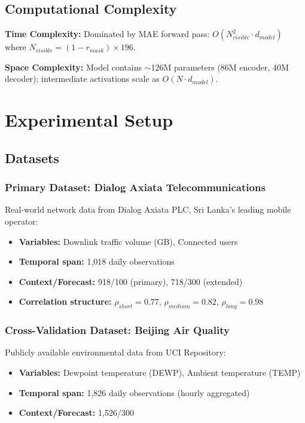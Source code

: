 \documentclass[preprint,12pt,authoryear]{elsarticle}
\begin{document}
\subsection{Computational Complexity}

\textbf{Time Complexity:} Dominated by MAE forward pass: $O(N_{visible}^2 \cdot d_{model})$ where $N_{visible} = (1 - r_{mask}) \times 196$.

\textbf{Space Complexity:} Model contains $\sim$126M parameters (86M encoder, 40M decoder); intermediate activations scale as $O(N \cdot d_{model})$.

\section{Experimental Setup}
\label{sec:experiments}

\subsection{Datasets}

\subsubsection{Primary Dataset: Dialog Axiata Telecommunications}

Real-world network data from Dialog Axiata PLC, Sri Lanka's leading mobile operator:
\begin{itemize}
    \item \textbf{Variables:} Downlink traffic volume (GB), Connected users
    \item \textbf{Temporal span:} 1,018 daily observations
    \item \textbf{Context/Forecast:} 918/100 (primary), 718/300 (extended)
    \item \textbf{Correlation structure:} $\rho_{short}=0.77$, $\rho_{medium}=0.82$, $\rho_{long}=0.98$
\end{itemize}

\subsubsection{Cross-Validation Dataset: Beijing Air Quality}

Publicly available environmental data from UCI Repository:
\begin{itemize}
    \item \textbf{Variables:} Dewpoint temperature (DEWP), Ambient temperature (TEMP)
    \item \textbf{Temporal span:} 1,826 daily observations (hourly aggregated)
    \item \textbf{Context/Forecast:} 1,526/300
\end{itemize}
\end{document}
